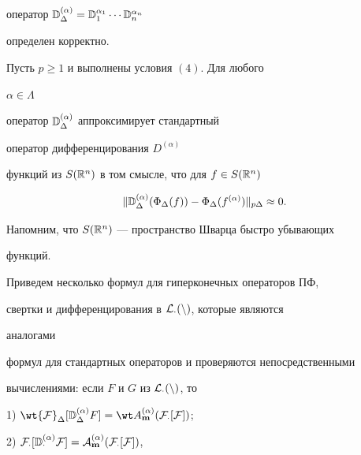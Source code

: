 оператор $\Bbb D^{(\alpha)}_\Delta=\Bbb D^{\alpha_1}_1\dotsb\Bbb 


D^{\alpha_n}_n$ 


определен корректно. 


 


\begin{thm} Пусть $p\ge 1$ и выполнены условия $(4)$. Для любого 


$\alpha\in\Lambda$ 


оператор $\Bbb D^{(\alpha)}_\Delta$ аппроксимирует стандартный 


оператор дифференцирования $D^{(\alpha)}$ 


функций из $S(\Bbb R^n)$ в том смысле, что для $f\in S(\Bbb R^n)$ 


$$ 


\|\Bbb D^{(\alpha)}_\Delta(\Phi_\Delta(f))- 


\Phi_\Delta(f^{(\alpha)})\|_{p\Delta}\approx 0. 


$$ 


\end{thm} 


 


Напомним, что $S(\Bbb R^n)$ --- пространство Шварца быстро убывающих 


функций. 


 


Приведем несколько формул для гиперконечных операторов ПФ, 


свертки и дифференцирования в $\cal L_\Delta(n)$, которые являются 


аналогами 


формул для стандартных операторов и проверяются непосредственными 


вычислениями: если $F$ и $G$ из $\cal L_\Delta(n)$, то 


 


1) $\wt{\cal F}_\Delta[\Bbb D^{(\alpha)}_\Delta F]= 


\wt A^{(\alpha)}_{\bold m}(\cal F_\Delta[F])$;


 


2) $\cal F_\Delta[\Bbb D^{(\alpha)}_\Delta F]= 


A^{(\alpha)}_{\bold m}(\cal F_\Delta[F])$, 


 


